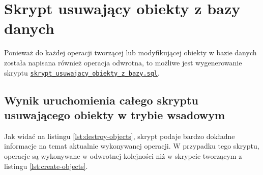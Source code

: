 \section{Skrypt usuwający obiekty z bazy danych}

Ponieważ do każdej operacji tworzącej lub modyfikującej obiekty w bazie danych została napisana również operacja odwrotna, to możliwe jest wygenerowanie skryptu \href{run:skrypt_usuwajacy_obiekty_z_bazy.sql}{\texttt{skrypt\_usuwajacy\_obiekty\_z\_bazy.sql}}.

\subsection{Wynik uruchomienia całego skryptu usuwającego obiekty w trybie wsadowym}

Jak widać na listingu \ref{lst:destroy-objects}, skrypt podaje bardzo dokładne informacje na temat aktualnie wykonywanej operacji. W przypadku tego skryptu, operacje są wykonywane w odwrotnej kolejności niż w skrypcie tworzącym z listingu \ref{lst:create-objects}.

